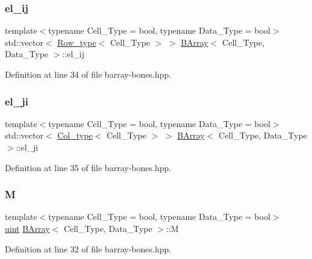 \subsubsection{\texorpdfstring{el\+\_\+ij}{el\_ij}}
{\footnotesize\ttfamily template$<$typename Cell\+\_\+\+Type = bool, typename Data\+\_\+\+Type = bool$>$ \\
std\+::vector$<$ \hyperlink{typedefs_8hpp_a83d6ee40a2ba22844108bb8b82e9b951}{Row\+\_\+type}$<$ Cell\+\_\+\+Type $>$ $>$ \hyperlink{class_b_array}{B\+Array}$<$ Cell\+\_\+\+Type, Data\+\_\+\+Type $>$\+::el\+\_\+ij}



Definition at line 34 of file barray-\/bones.\+hpp.

\mbox{\label{class_b_array_aad8ce1aa5fddd3899164c1aa1dfede94}} 
\subsubsection{\texorpdfstring{el\+\_\+ji}{el\_ji}}
{\footnotesize\ttfamily template$<$typename Cell\+\_\+\+Type = bool, typename Data\+\_\+\+Type = bool$>$ \\
std\+::vector$<$ \hyperlink{typedefs_8hpp_a00f3fedec1671706175b572e5c57ee0b}{Col\+\_\+type}$<$ Cell\+\_\+\+Type $>$ $>$ \hyperlink{class_b_array}{B\+Array}$<$ Cell\+\_\+\+Type, Data\+\_\+\+Type $>$\+::el\+\_\+ji}



Definition at line 35 of file barray-\/bones.\+hpp.

\mbox{\label{class_b_array_a197359753fd1bc054a1a14f7641d3fd1}} 
\subsubsection{\texorpdfstring{M}{M}}
{\footnotesize\ttfamily template$<$typename Cell\+\_\+\+Type = bool, typename Data\+\_\+\+Type = bool$>$ \\
\hyperlink{typedefs_8hpp_a91ad9478d81a7aaf2593e8d9c3d06a14}{uint} \hyperlink{class_b_array}{B\+Array}$<$ Cell\+\_\+\+Type, Data\+\_\+\+Type $>$\+::M}



Definition at line 32 of file barray-\/bones.\+hpp.

\mbox{\label{class_b_array_a4b34ec8636c989efe80bbe3f1cea217e}} 
